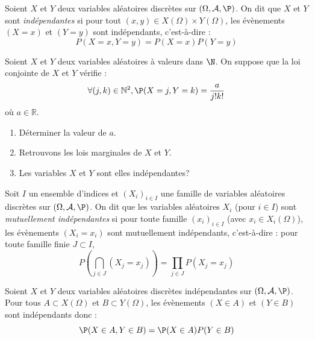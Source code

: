 \documentclass[a4paper,10pt]{report}
\begin{document}
\begin{defin}
Soient $X$ et $Y$ deux variables aléatoires discrètes sur $(\Omega, \mathcal{A}, \P)$. On dit que $X$ et $Y$ sont \textit{indépendantes} si pour tout $(x,y) \in X(\Omega) \times Y(\Omega)$, les évènements $(X=x)$ et $(Y=y)$ sont indépendants, c'est-à-dire :
$$ P(X=x,Y=y)=P(X=x)P(Y=y)$$
\end{defin}

\begin{ex} Soient $X$ et $Y$ deux variables aléatoires à valeurs dans $\N$. On suppose que la loi conjointe de $X$ et $Y$ vérifie :
  \[
  \forall (j,k) \in \mathbb{N}^2,  \P( X = j,Y = k ) = \frac{a}{j!k!}
  \]
où $a \in \mathbb{R}$.
  \begin{enumerate}
  \item
    Déterminer la valeur de $a$.
    
    \vspace{4cm}
  \item
    Retrouvons les lois marginales de $X$ et $Y$.
    
    \vspace{5cm}
  \item
    Les variables $X$ et $Y$ sont elles indépendantes?
    
    \vspace{3cm}
  \end{enumerate}
\end{ex}

\begin{defin}
Soit $I$ un ensemble d'indices et $(X_i)_{i \in I}$ une famille de variables aléatoires discrètes sur $(\Omega, \mathcal{A}, \P)$. On dit que les variables aléatoires $X_i$ (pour $i \in I$) sont \textit{mutuellement indépendantes} si pour toute famille $(x_i)_{i \in I}$ (avec $x_i \in X_i(\Omega)$), les évènements $(X_i=x_i)$ sont mutuellement indépendants, c'est-à-dire : pour toute famille finie $J \subset I$,
$$ P \left( \bigcap_{j \in J} (X_j=x_j) \right) = \prod_{j \in J} P(X_j=x_j)$$
\end{defin}


\begin{prop}[Admise] Soient $X$ et $Y$ deux variables aléatoires discrètes indépendantes sur $(\Omega, \mathcal{A}, \P)$.  Pour tous $A \subset X(\Omega)$ et $B \subset Y(\Omega)$, les évènements $(X \in A)$ et $(Y \in B)$ sont indépendants donc :
$$ \P(X \in A, Y \in B) = \P(X \in A) P(Y \in B)$$
\end{prop}
\end{document}
